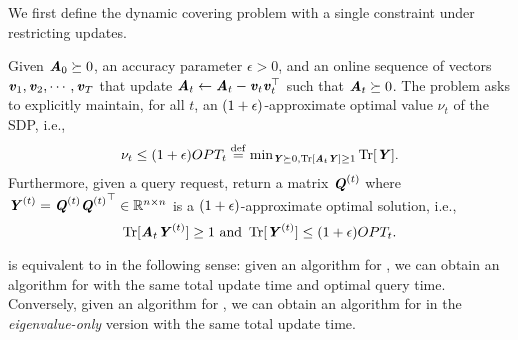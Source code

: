 We first define the dynamic covering problem with a single constraint under restricting updates.

\begin{problem}\label{prob:dynsdp} Given $\AA_0\succeq 0$, an accuracy parameter $\epsilon>0$, and an online sequence of vectors $\vv_1,\vv_2,\cdots,\vv_T$ that update $\AA_t \gets \AA_t -\vv_t\vv_t^{\top}$ such that $\AA_t\succeq 0$. The problem asks to explicitly maintain, for all $t$, an $(1+\eps)$-approximate optimal value $\nu_t$ of the SDP, i.e.,  $$\nu_t \leq (1+\epsilon)OPT_t \defeq {\min}_{\YY\succeq 0, \Tr[\AA_t\YY]\geq 1}  \Tr[\YY].$$
Furthermore, given a query request, return a matrix $\QQ^{(t)}$ where $\YY^{(t)} = \QQ^{(t)}{\QQ^{(t)}}^{\top} \in \mathbb{R}^{n\times n}$ is a $(1+\eps)$-approximate optimal solution, i.e., 
    $$\Tr[\AA_t\YY^{(t)}]\geq 1\text{ and }\Tr[\YY^{(t)}]\leq \left(1+\epsilon\right) OPT_t.$$
\end{problem}
 is equivalent to  in the following sense: given an algorithm for , we can obtain an algorithm for  with the same total update time and optimal query time. Conversely, given an algorithm for , we can obtain an algorithm for  in the \emph{eigenvalue-only} version with the same total update time.

